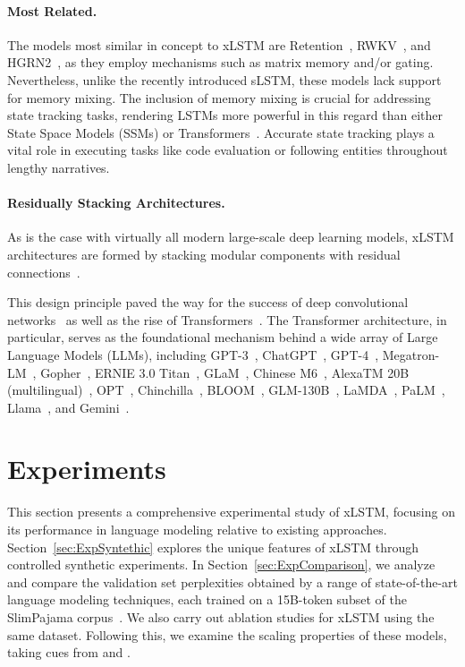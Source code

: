 \paragraph{Most Related.} The models most similar in concept to xLSTM are Retention~\citep{Sun:23arxiv}, RWKV~\citep{Peng:23arxivshort,Peng:24arxivshort}, and HGRN2~\citep{Qin:24arxiv}, as they employ mechanisms such as matrix memory and/or gating. Nevertheless, unlike the recently introduced sLSTM, these models lack support for memory mixing. The inclusion of memory mixing is crucial for addressing state tracking tasks, rendering LSTMs more powerful in this regard than either State Space Models (SSMs) or Transformers~\citep{Merrill:24,Deletang:23}. Accurate state tracking plays a vital role in executing tasks like code evaluation or following entities throughout lengthy narratives.

\paragraph{Residually Stacking Architectures.} As is the case with virtually all modern large-scale deep learning models, xLSTM architectures are formed by stacking modular components with residual connections~\citep{Srivastava:15,He:16}.

This design principle paved the way for the success of deep convolutional networks~\citep{He:16} as well as the rise of Transformers~\citep{Vaswani:17}. The Transformer architecture, in particular, serves as the foundational mechanism behind a wide array of Large Language Models (LLMs), including GPT-3~\citep{Brown:20short}, ChatGPT~\citep{Schulman:22short}, GPT-4~\citep{Achiam:23gpt4short}, Megatron-LM~\citep{Shoeybi:19}, Gopher~\citep{Rae:21short}, ERNIE 3.0 Titan~\citep{Wang:21arxivshort}, GLaM~\citep{Du:21glamshort}, Chinese M6~\citep{Lin:21}, AlexaTM 20B (multilingual)~\citep{Soltan:22}, OPT~\citep{Zhang:22opt}, Chinchilla~\citep{Hoffmann:22short}, BLOOM~\citep{Scao:22arxivshort}, GLM-130B~\citep{Zeng:22arxivshort}, LaMDA~\citep{Thoppilan:22short}, PaLM~\citep{Chowdhery:22short}, Llama~\citep{Touvron:23arxiv}, and Gemini~\citep{GeminiTeam:23arxiv,Reid:24arxiv}.

\section{Experiments}
\label{sec:Exp}

This section presents a comprehensive experimental study of xLSTM, focusing on its performance in language modeling relative to existing approaches. Section~\ref{sec:ExpSyntethic} explores the unique features of xLSTM through controlled synthetic experiments. In Section~\ref{sec:ExpComparison}, we analyze and compare the validation set perplexities obtained by a range of state-of-the-art language modeling techniques, each trained on a 15B-token subset of the SlimPajama corpus~\citep{Soboleva:23}. We also carry out ablation studies for xLSTM using the same dataset. Following this, we examine the scaling properties of these models, taking cues from \citet{Kaplan:20} and \citet{Brown:20short}.

